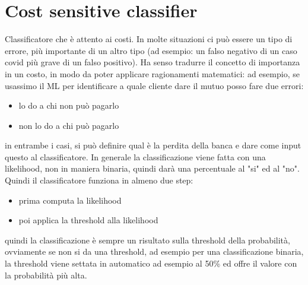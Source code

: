 \documentclass{article}
\begin{document}
\section{Cost sensitive classifier}
Classificatore che è attento ai costi. In molte situazioni ci può essere un tipo di errore, più importante di un altro tipo (ad esempio: un falso negativo di un caso covid più grave di un falso positivo). Ha senso tradurre il concetto di importanza in un costo, in modo da poter applicare ragionamenti matematici: ad esempio, se usassimo il ML per identificare a quale cliente dare il mutuo posso fare due errori:
\begin{itemize}
\item lo do a chi non può pagarlo
\item non lo do a chi può pagarlo
\end{itemize}
in entrambe i casi, si può definire qual è la perdita della banca e dare come input questo al classificatore. In generale la classificazione viene fatta con una likelihood, non in maniera binaria, quindi darà una percentuale al "si" ed al "no". Quindi il classificatore funziona in almeno due step:
\begin{itemize}
\item prima computa la likelihood
\item poi applica la threshold alla likelihood
\end{itemize}
quindi la classificazione è sempre un risultato sulla threshold della probabilità, ovviamente se non si da una threshold, ad esempio per una classificazione binaria, la threshold viene settata in automatico ad esempio al 50\% ed offre il valore con la probabilità più alta.
\end{document}
